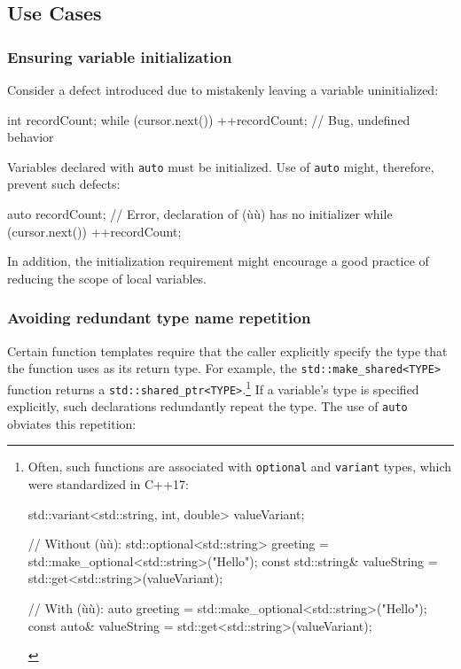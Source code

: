 \subsection[Use Cases]{Use Cases}\label{use-cases-auto}

\subsubsection[Ensuring variable initialization]{Ensuring variable initialization}\label{ensuring-variable-initialization}

Consider a defect introduced due to mistakenly leaving a variable
uninitialized:

\begin{emcppslisting}[language=C++]
int recordCount;
while (cursor.next()) { ++recordCount; }  // Bug, undefined behavior
\end{emcppslisting}
    
\noindent Variables declared with \lstinline!auto! must be initialized. Use of
\lstinline!auto! might, therefore, prevent such defects:

\begin{emcppslisting}[language=C++]
auto recordCount; // Error, declaration of (ù{}ù) has no initializer
while (cursor.next()) { ++recordCount; }
\end{emcppslisting}
    
\noindent In addition, the initialization requirement might encourage a good
practice of reducing the scope of local variables.

\subsubsection[Avoiding redundant type name repetition]{Avoiding redundant type name repetition}\label{avoiding-redundant-type-name-repetition}

Certain function templates require that the caller explicitly specify
the type that the function uses as its return type. For example, the
\lstinline!std::make_shared<TYPE>! function returns a
\lstinline!std::shared_ptr<TYPE>!.{\cprotect\footnote{Often, such
functions are associated with \lstinline!optional! and \lstinline!variant!
types, which were standardized in C++17:

\begin{emcppslisting}[language=C++, style=footcode,]
std::variant<std::string, int, double> valueVariant;

// Without (ù{}ù):
std::optional<std::string> greeting = std::make_optional<std::string>("Hello");
const std::string& valueString = std::get<std::string>(valueVariant);

// With (ù{}ù):
auto greeting = std::make_optional<std::string>("Hello");
const auto& valueString = std::get<std::string>(valueVariant);
\end{emcppslisting}
      }} If a variable's type is specified explicitly, such declarations
redundantly repeat the type. The use of \lstinline!auto! obviates this repetition:

